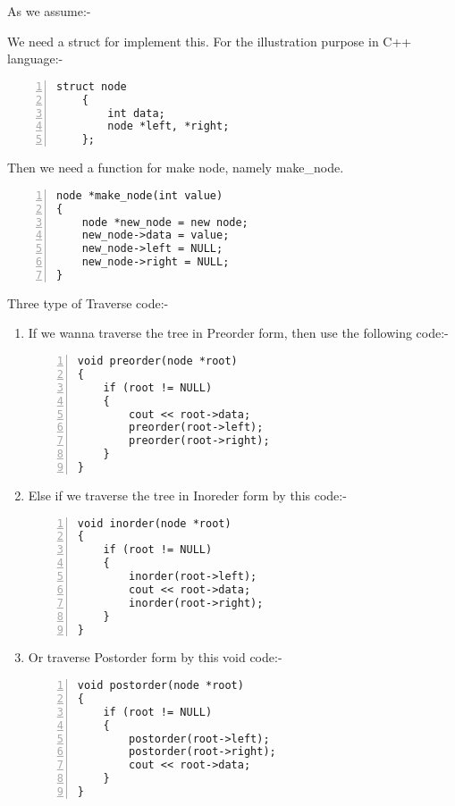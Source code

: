 \documentclass[pt=100]{article}
\begin{document}
As we assume:-
\begin{center}
\end{center}

We need a struct for implement this. For the illustration purpose in C++ language:-\hfill
\begin{lstlisting}[caption = struct for node, numbers = left]
	struct node
	{
		int data;
		node *left, *right;
	};
\end{lstlisting}

Then we need a function for make node, namely make\_node.\hfill
\begin{lstlisting}[caption = Function for make a new node, numbers = left]
node *make_node(int value)
{
    node *new_node = new node;
    new_node->data = value;
    new_node->left = NULL;
    new_node->right = NULL;
}
\end{lstlisting}

Three type of Traverse code:-\hfill
\begin{enumerate}

	\item If we wanna traverse the tree in Preorder form, then use the following code:-\hfill
	\begin{lstlisting}[caption = Void function for preorder traverse, numbers = left]
void preorder(node *root)
{
    if (root != NULL)
    {
        cout << root->data;
        preorder(root->left);
        preorder(root->right);
    }
}
	\end{lstlisting}
	
	\item Else if we traverse the tree in Inoreder form by this code:-\hfill
	\begin{lstlisting}[caption = Void function for preorder traverse, numbers = left]
void inorder(node *root)
{
    if (root != NULL)
    {
        inorder(root->left);
        cout << root->data;
        inorder(root->right);
    }
}
	\end{lstlisting}
	
	\item Or traverse Postorder form by this void code:-\hfill
	\begin{lstlisting}[caption = Void function for preorder traverse, numbers = left]
void postorder(node *root)
{
    if (root != NULL)
    {
        postorder(root->left);
        postorder(root->right);
        cout << root->data;
    }
}
		\end{lstlisting}
	
\end{enumerate}
\end{document}
